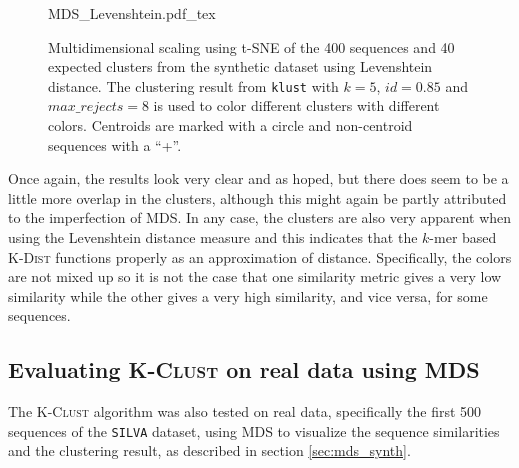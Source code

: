 \begin{figure}[h!]
  \centering
  \def\svgwidth{\columnwidth}
  {MDS_Levenshtein.pdf_tex}
  \caption{Multidimensional scaling using t-SNE of the 400 sequences and 40
    expected clusters from the synthetic dataset using Levenshtein distance.
    The clustering result from \texttt{klust} with $k=5$, $id=0.85$ and
    $max\_rejects=8$ is used to color different clusters with different
    colors. Centroids are marked with a circle and non-centroid sequences
    with a ``+''.}
  \label{fig:mds_synth_lev}
\end{figure}

Once again, the results look very clear and as hoped, but there does seem to be
a little more overlap in the clusters, although this might again be partly
attributed to the imperfection of MDS. In any case, the clusters are also very
apparent when using the Levenshtein distance measure and this indicates that
the $k$-mer based \textsc{K-Dist} functions properly as an approximation of
distance. Specifically, the colors are not mixed up so it is not the case that
one similarity metric gives a very low similarity while the other gives a very
high similarity, and vice versa, for some sequences.


\subsection{Evaluating \textsc{K-Clust} on real data using MDS}
\label{sec:mds_real_data}

The \textsc{K-Clust} algorithm was also tested on real data, specifically the
first 500 sequences of the \texttt{SILVA} dataset, using MDS to visualize the
sequence similarities and the clustering result, as described in section
\ref{sec:mds_synth}.

